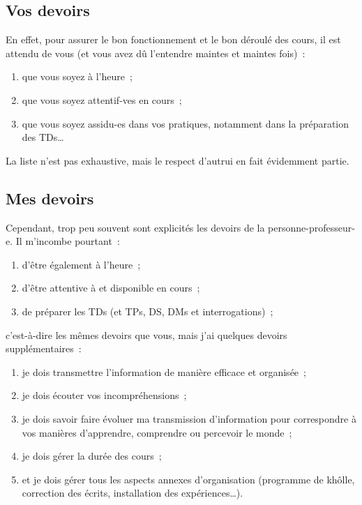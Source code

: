 \documentclass[a4paper, 10pt, final, garamond]{book}
\begin{document}
\subsection{Vos devoirs}

En effet, pour assurer le bon fonctionnement et le bon déroulé des cours, il est
attendu de vous (et vous avez dû l'entendre maintes et maintes fois)~:

\begin{enumerate}
	\item que vous soyez à l'heure~;
	\item que vous soyez attentif-ves en cours~;
	\item que vous soyez assidu-es dans vos pratiques, notamment dans la
	      préparation des TDs…
\end{enumerate}

La liste n'est pas exhaustive, mais le respect d'autrui en fait évidemment
partie.

\subsection{Mes devoirs}

Cependant, trop peu souvent sont explicités les devoirs de la
personne-professeur-e. Il m'incombe pourtant~:

\begin{enumerate}
	\item d'être également à l'heure~;
	\item d'être attentive à et disponible en cours~;
	\item de préparer les TDs (et TPs, DS, DMs et interrogations)~;
\end{enumerate}
c'est-à-dire les mêmes devoirs que vous, mais j'ai quelques devoirs
supplémentaires~:
\begin{enumerate}[resume]
	\item je dois transmettre l'information de manière efficace et organisée~;
	\item je dois écouter vos incompréhensions~;
	\item je dois savoir faire évoluer ma transmission d'information pour
	      correspondre à vos manières d'apprendre, comprendre ou percevoir le
	      monde~;
	\item je dois gérer la durée des cours~;
	\item et je dois gérer tous les aspects annexes d'organisation (programme de
	      khôlle, correction des écrits, installation des expériences…).
\end{enumerate}
\end{document}
